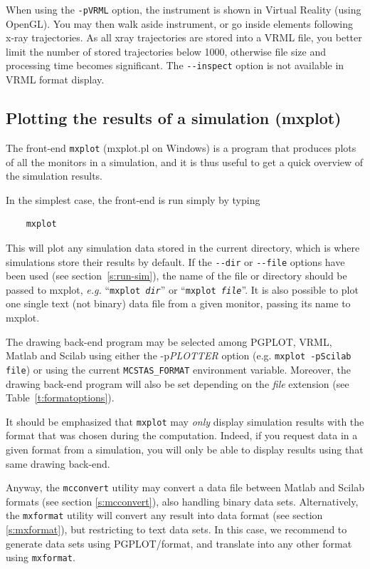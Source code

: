 When using the \verb+-pVRML+ option, the instrument is shown in Virtual Reality (using OpenGL). You may then walk aside instrument, or go inside elements following x-ray trajectories. As all xray trajectories are stored into a VRML file, you better limit the number of stored trajectories below 1000, otherwise file size and processing time becomes significant. The \verb+--inspect+ option is not available in VRML format display.

\subsection{Plotting the results of a simulation (mxplot)}
\label{s:mxplot}

The front-end \verb+mxplot+ (mxplot.pl on Windows) is a program that produces
plots of all the monitors in a simulation, and it is thus useful to get
a quick overview of the simulation results.

In the simplest case, the front-end is run simply by typing
\begin{verbatim}
    mxplot
\end{verbatim}
This will plot any simulation data stored in the current directory,
which is where simulations store their results by default. If the
\verb+--dir+ or \verb+--file+ options have been used (see
section~\ref{s:run-sim}), the name of the file or directory should be
passed to mxplot, {\em e.g.} ``\texttt{mxplot \textit{dir}}'' or ``\texttt{mxplot
  \textit{file}}''.
It is also possible to plot one single text (not binary) data file from a given monitor, passing its name to mxplot.

The drawing back-end program may be selected among PGPLOT, VRML, Matlab and Scilab using either the -p\textit{PLOTTER} option (e.g. \verb+mxplot -pScilab file+) or using the current \verb+MCSTAS_FORMAT+ environment variable.  Moreover, the drawing back-end program will also be set depending on the \textit{file} extension (see Table~\ref{t:formatoptions}).

It should be emphasized that \verb+mxplot+ may \emph{only} display simulation results with the format that was chosen during the computation. Indeed, if you request data in a given format from a simulation, you will only be able to display results using that same drawing back-end.

Anyway, the \verb+mcconvert+ utility may convert a \MCX data file between Matlab and Scilab formats (see section \ref{s:mcconvert}), also handling binary data sets. Alternatively, the \verb+mxformat+ utility will convert any \MCX result into data format (see section \ref{s:mxformat}), but restricting to text data sets. In this case, we recommend to generate data sets using PGPLOT/\MCX  format, and translate into any other format using \verb+mxformat+.

